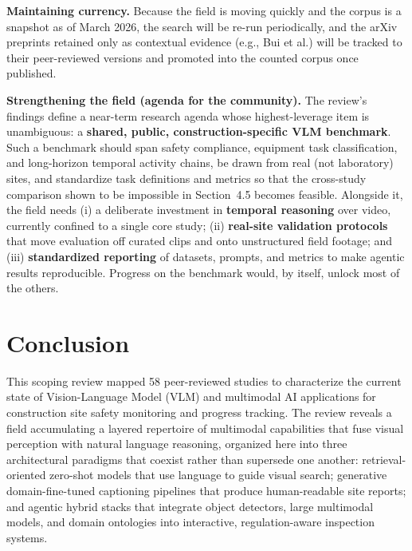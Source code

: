 \documentclass[10pt,letterpaper]{article}
\begin{document}
\textbf{Maintaining currency.} Because the field is moving quickly and the corpus is a snapshot as of March 2026, the search will be re-run periodically, and the arXiv preprints retained only as contextual evidence (e.g., Bui et al.) will be tracked to their peer-reviewed versions and promoted into the counted corpus once published.

\textbf{Strengthening the field (agenda for the community).} The review's findings define a near-term research agenda whose highest-leverage item is unambiguous: a \textbf{shared, public, construction-specific VLM benchmark}. Such a benchmark should span safety compliance, equipment task classification, and long-horizon temporal activity chains, be drawn from real (not laboratory) sites, and standardize task definitions and metrics so that the cross-study comparison shown to be impossible in Section~4.5 becomes feasible. Alongside it, the field needs (i) a deliberate investment in \textbf{temporal reasoning} over video, currently confined to a single core study; (ii) \textbf{real-site validation protocols} that move evaluation off curated clips and onto unstructured field footage; and (iii) \textbf{standardized reporting} of datasets, prompts, and metrics to make agentic results reproducible. Progress on the benchmark would, by itself, unlock most of the others.

\section{Conclusion}

This scoping review mapped 58 peer-reviewed studies to characterize the current state of Vision-Language Model (VLM) and multimodal AI applications for construction site safety monitoring and progress tracking. The review reveals a field accumulating a layered repertoire of multimodal capabilities that fuse visual perception with natural language reasoning, organized here into three architectural paradigms that coexist rather than supersede one another: retrieval-oriented zero-shot models that use language to guide visual search; generative domain-fine-tuned captioning pipelines that produce human-readable site reports; and agentic hybrid stacks that integrate object detectors, large multimodal models, and domain ontologies into interactive, regulation-aware inspection systems.
\end{document}
